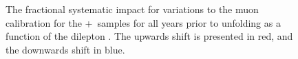 \begin{figure}[h!]
  \caption{The fractional systematic impact for variations to the muon calibration for the \powheg+\pythia~samples for all years prior to unfolding as a function of the dilepton \pt. The upwards shift is presented in red, and the downwards shift in blue.}
  \label{fig:PP8MuCalSystpTll}
\end{figure}

